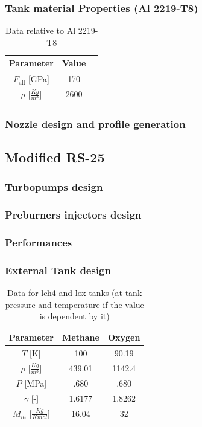 \subsubsection*{Tank material Properties (Al 2219-T8)}
\begin{table}[H]
    \centering
    \begin{tabular}{|c|c|c|}\hline
    \textbf{Parameter} & \textbf{Value} \\ \hline
    $F_{\text{all}}$ [GPa]& 170 \\ \hline
    $\rho$ [$\frac{Kg}{m^3}$]& 2600\\ \hline
\end{tabular}
    \caption{Data relative to Al 2219-T8}
    \label{tab:data_Al2219-T8}
\end{table}
\subsubsection*{Nozzle design and profile generation}
\subsection*{Modified RS-25}
\subsubsection*{Turbopumps design}
\subsubsection*{Preburners injectors design}

\subsubsection*{Performances}

\subsubsection*{External Tank design}
\begin{table}[H]
    \centering
    \begin{tabular}{|c|c|c|}\hline
      \textbf{Parameter} & \textbf{Methane} & \textbf{Oxygen} \\ \hline
    $T$ [K] & 100 & 90.19\\ \hline
    $\rho$ [$\frac{Kg}{m^3}$]& 439.01&1142.4\\ \hline
    $P$ [MPa] & .680 & .680\\ \hline
    $\gamma$ [-] & 1.6177& 1.8262\\ \hline
    $M_m$ [$\frac{Kg}{Kmol}$] & 16.04& 32\\ \hline
\end{tabular}
    \caption{Data for \acrshort{lch4} and \acrshort{lox} tanks (at tank pressure and temperature if the value is dependent by it)}
    \label{tab:data_tank_ch4}
\end{table}

